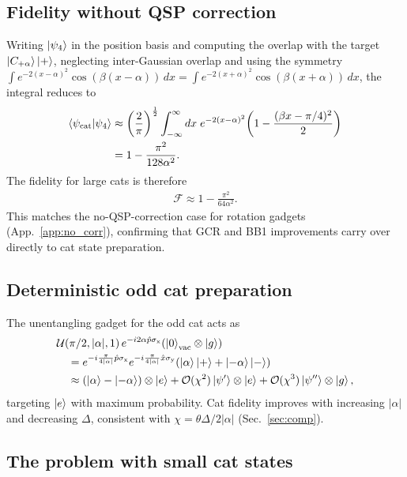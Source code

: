 \documentclass[aps,prx,showpacs,notitlepage,twocolumn,superscriptaddress,nofootinbib,preprintnumbers,floatfix,10pt, longbibliography]{revtex4-2}
\begin{document}
{\subsection{Fidelity without QSP correction}\label{app:cat_I}

Writing $\ket{\psi_4}$ in the position basis and computing the overlap with
the target $\ket{C_{+\alpha}}\ket{+}$, neglecting inter-Gaussian overlap
and using the symmetry
$\int e^{-2(x-\alpha)^2}\cos(\beta(x-\alpha))\,dx
=\int e^{-2(x+\alpha)^2}\cos(\beta(x+\alpha))\,dx$,
the integral reduces to
\begin{align}
\braket{\psi_\mathrm{cat}|\psi_4}
  &\approx \left(\frac{2}{\pi}\right)^{\frac{1}{2}}
  \int_{-\infty}^{\infty}dx\;
  e^{-2(x-\alpha)^2}\!\left(1 - \frac{(\beta x - \pi/4)^2}{2}\right)\\
  &= 1 - \frac{\pi^2}{128\alpha^2}.
\end{align}
The fidelity for large cats is therefore
\begin{align}
\mathcal{F} \approx 1 - \frac{\pi^2}{64\alpha^2}.\label{eqn:cat_fidelity}
\end{align}
This matches the no-QSP-correction case for rotation gadgets
(App.~\ref{app:no_corr}), confirming that GCR and BB1 improvements carry
over directly to cat state preparation.

\subsection{Deterministic odd cat preparation}\label{app:odd-cat}

The unentangling gadget for the odd cat acts as
\begin{align}
  &\mathcal{U}(\pi/2,|\alpha|,1)\,
    e^{-i2\alpha\hat{p}\sigma_\mathrm{x}}
    (\ket{0}_\mathrm{vac}\otimes\ket{g})
  \nonumber\\
  &\quad= e^{-i\frac{\pi}{4|\alpha|}\hat{p}\sigma_\mathrm{x}}
          e^{-i\frac{\pi}{4|\alpha|}\hat{x}\sigma_\mathrm{y}}
    (\ket{\alpha}\ket{+}+\ket{-\alpha}\ket{-})
    \label{eq:cat-stated}\\
  &\quad\approx (\ket{\alpha}-\ket{-\alpha})\otimes\ket{e}
    +\mathcal{O}(\chi^2)\ket{\psi'}\otimes\ket{e}
    +\mathcal{O}(\chi^3)\ket{\psi''}\otimes\ket{g},
\end{align}
targeting $\ket{e}$ with maximum probability.  Cat fidelity improves with
increasing $|\alpha|$ and decreasing $\Delta$, consistent with
$\chi=\theta\Delta/2|\alpha|$ (Sec.~\ref{sec:comp}).

\subsection{The problem with small cat states}\label{app:small_cats}

}
\end{document}
